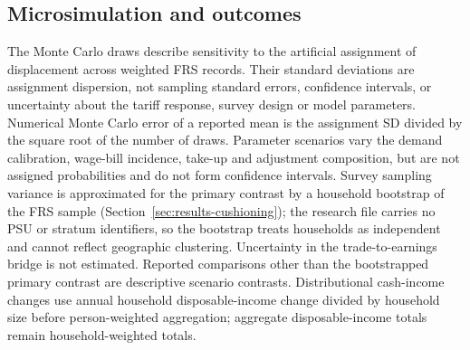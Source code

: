 \subsection{Microsimulation and outcomes}\label{sec:method-microsim}

The Monte Carlo draws describe sensitivity to the artificial assignment of displacement across weighted FRS records. Their standard deviations are assignment dispersion, not sampling standard errors, confidence intervals, or uncertainty about the tariff response, survey design or model parameters. Numerical Monte Carlo error of a reported mean is the assignment SD divided by the square root of the number of draws. Parameter scenarios vary the demand calibration, wage-bill incidence, take-up and adjustment composition, but are not assigned probabilities and do not form confidence intervals. Survey sampling variance is approximated for the primary contrast by a household bootstrap of the FRS sample (Section~\ref{sec:results-cushioning}); the research file carries no PSU or stratum identifiers, so the bootstrap treats households as independent and cannot reflect geographic clustering. Uncertainty in the trade-to-earnings bridge is not estimated. Reported comparisons other than the bootstrapped primary contrast are descriptive scenario contrasts. Distributional cash-income changes use annual household disposable-income change divided by household size before person-weighted aggregation; aggregate disposable-income totals remain household-weighted totals.

